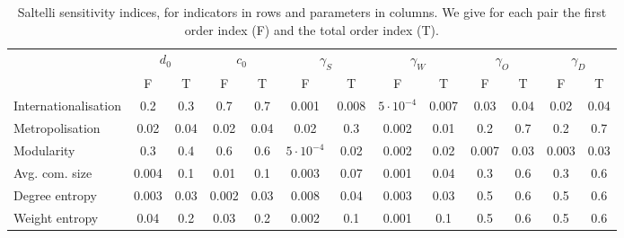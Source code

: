 \begin{table}[h!]
\begin{adjustwidth}{-2.25in}{0in}
\caption{Saltelli sensitivity indices, for indicators in rows and parameters in columns. We give for each pair the first order index (F) and the total order index (T).\label{tab:saltelli}}
\hspace{-1cm}\begin{tabular}{|l|c|c|c|c|c|c|c|c|c|c|c|c|}
\hline
 & \multicolumn{2}{|c|}{$d_0$} & \multicolumn{2}{|c|}{$c_0$} & \multicolumn{2}{|c|}{$\gamma_S$} & \multicolumn{2}{|c|}{$\gamma_W$} & \multicolumn{2}{|c|}{$\gamma_O$} & \multicolumn{2}{|c|}{$\gamma_D$} \\
 & F & T & F & T & F & T & F & T & F & T & F & T \\
 \hline
Internationalisation & 0.2 & 0.3 & 0.7 & 0.7 & 0.001 & 0.008 & $5\cdot 10^{-4}$ & 0.007 & 0.03 & 0.04 & 0.02 & 0.04 \\
Metropolisation & 0.02 & 0.04 & 0.02 & 0.04 & 0.02 & 0.3 & 0.002 & 0.01 & 0.2 & 0.7 & 0.2 & 0.7 \\
Modularity & 0.3 & 0.4 & 0.6 & 0.6 & $5\cdot 10^{-4}$ & 0.02 & 0.002 & 0.02 & 0.007 & 0.03 & 0.003 & 0.03 \\
Avg. com. size & 0.004 & 0.1 & 0.01 & 0.1 & 0.003 & 0.07 & 0.001 & 0.04 & 0.3 & 0.6 & 0.3 & 0.6 \\
Degree entropy & 0.003 & 0.03 & 0.002 & 0.03 & 0.008 & 0.04 & 0.003 & 0.03 & 0.5 & 0.6 & 0.5 & 0.6 \\
Weight entropy & 0.04 & 0.2 & 0.03 & 0.2 & 0.002 & 0.1 & 0.001 & 0.1 & 0.5 & 0.6 & 0.5 & 0.6 \\\hline
\end{tabular}
\end{adjustwidth}
\end{table}





